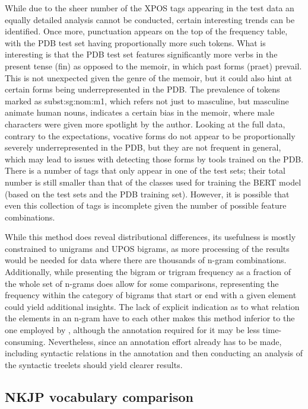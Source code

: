 While due to the sheer number of the XPOS tags appearing in the test data an equally detailed analysis cannot be conducted, certain interesting trends can be identified. Once more, punctuation appears on the top of the frequency table, with the PDB test set having proportionally more such tokens. What is interesting is that the PDB test set features significantly more verbs in the present tense (fin) as opposed to the memoir, in which past forms (praet) prevail. This is not unexpected given the genre of the memoir, but it could also hint at certain forms being underrepresented in the PDB. The prevalence of tokens marked as subst:sg:nom:m1, which refers not just to masculine, but masculine animate human nouns, indicates a certain bias in the memoir, where male characters were given more spotlight by the author. Looking at the full data, contrary to the expectations, vocative forms do not appear to be proportionally severely underrepresented in the PDB, but they are not frequent in general, which may lead to issues with detecting those forms by tools trained on the PDB. There is a number of tags that only appear in one of the test sets; their total number is still smaller than that of the classes used for training the BERT model (based on the test sets and the PDB training set). However, it is possible that even this collection of tags is incomplete given the number of possible feature combinations.

While this method does reveal distributional differences, its usefulness is mostly constrained to unigrams and UPOS bigrams, as more processing of the results would be needed for data where there are thousands of n-gram combinations. Additionally, while presenting the bigram or trigram frequency as a fraction of the whole set of n-grams does allow for some comparisons, representing the frequency within the category of bigrams that start or end with a given element could yield additional insights. The lack of explicit indication as to what relation the elements in an n-gram have to each other makes this method inferior to the one employed by \citet{johannsen-etal-2015-cross}, although the annotation required for it may be less time-consuming. Nevertheless, since an annotation effort already has to be made, including syntactic relations in the annotation and then conducting an analysis of the syntactic treelets should yield clearer results.  

\subsection{NKJP vocabulary comparison}
\label{subsec:nkjp-comparison-results}

